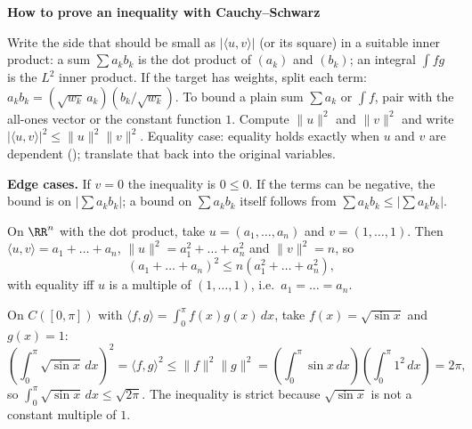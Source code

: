 \documentclass[10pt]{scrartcl}
\newcommand{\ip}[2]{\langle #1,#2\rangle}
\newenvironment{methodbox}[1]{\begin{mdframed}[style=mdbluebox,linecolor=NavyBlue,backgroundcolor=NavyBlue!3]\textbf{\color{NavyBlue}#1}\par\vspace{2pt}}{\end{mdframed}}
\begin{document}
\begin{fig}
\end{fig}

\begin{methodbox}{How to prove an inequality with Cauchy--Schwarz}
\begin{enumerate}[label=\arabic*.,leftmargin=1.5em,itemsep=2pt,topsep=2pt]
  \ii Write the side that should be small as $|\ip uv|$ (or its square) in a suitable inner product: a sum $\sum a_kb_k$ is the dot product of $(a_k)$ and $(b_k)$; an integral $\int fg$ is the $L^2$ inner product.
  \ii If the target has weights, split each term: $a_kb_k=(\sqrt{w_k}\,a_k)(b_k/\sqrt{w_k})$. To bound a plain sum $\sum a_k$ or $\int f$, pair with the all-ones vector or the constant function $1$.
  \ii Compute $\|u\|^2$ and $\|v\|^2$ and write $|\ip uv|^2\le\|u\|^2\|v\|^2$.
  \ii Equality case: equality holds exactly when $u$ and $v$ are dependent (); translate that back into the original variables.
\end{enumerate}
\textbf{Edge cases.} If $v=0$ the inequality is $0\le0$. If the terms can be negative, the bound is on $|\sum a_kb_k|$; a bound on $\sum a_kb_k$ itself follows from $\sum a_kb_k\le|\sum a_kb_k|$.
\end{methodbox}

\begin{example*}
  On $\RR^n$ with the dot product, take $u=(a_1,\dots,a_n)$ and $v=(1,\dots,1)$. Then $\ip uv=a_1+\dots+a_n$, $\|u\|^2=a_1^2+\dots+a_n^2$ and $\|v\|^2=n$, so
  \[ (a_1+\dots+a_n)^2\le n(a_1^2+\dots+a_n^2), \]
  with equality iff $u$ is a multiple of $(1,\dots,1)$, i.e.\ $a_1=\dots=a_n$.
\end{example*}

\begin{example*}
  On $C([0,\pi])$ with $\ip fg=\int_0^\pi f(x)g(x)\,dx$, take $f(x)=\sqrt{\sin x}$ and $g(x)=1$:
  \[
    \left(\int_0^\pi \sqrt{\sin x}\,dx\right)^2 = \ip fg^2 \le \|f\|^2\|g\|^2 = \left(\int_0^\pi \sin x\,dx\right)\left(\int_0^\pi 1^2\,dx\right) = 2\pi,
  \]
  so $\int_0^\pi\sqrt{\sin x}\,dx \le \sqrt{2\pi}$. The inequality is strict because $\sqrt{\sin x}$ is not a constant multiple of $1$.
\end{example*}
\end{document}
